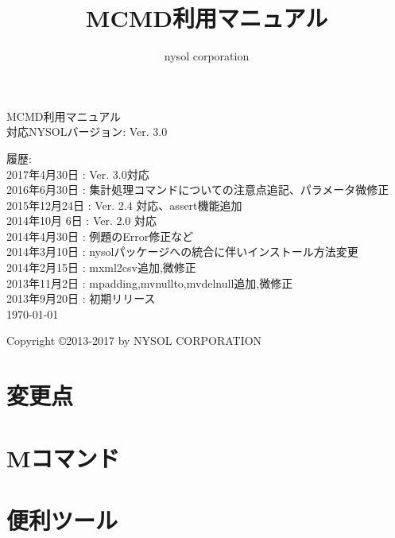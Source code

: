 \documentclass[a4paper]{jsbook}
\title{MCMD利用マニュアル}
\author{nysol corporation}
\date{}
\begin{document}
\begin{titlepage}
\begin{center}
{\huge MCMD利用マニュアル}\\
\vspace{10truept}
{\normalsize 対応NYSOLバージョン: Ver. 3.0}\\
\vspace{1cm}

履歴:\\
2017年4月30日 : Ver. 3.0対応\\
2016年6月30日 : 集計処理コマンドについての注意点追記、パラメータ微修正\\
2015年12月24日 : Ver. 2.4 対応、assert機能追加\\
2014年10月 6日 : Ver. 2.0 対応\\
2014年4月30日 : 例題のError修正など\\
2014年3月10日 : nysolパッケージへの統合に伴いインストール方法変更\\
2014年2月15日 : mxml2csv追加,微修正\\
2013年11月2日 : mpadding,mvnullto,mvdelnull追加,微修正\\
2013年9月20日 : 初期リリース\\
\vspace{13cm}
{\small \today}

{\small Copyright \copyright 2013-2017 by NYSOL CORPORATION}

\end{center}
\end{titlepage}

\setcounter{tocdepth}{1}
\label{mcmd:toc}
\tableofcontents

\chapter{変更点}


\chapter{Mコマンド}











\chapter{便利ツール}

\end{document}
